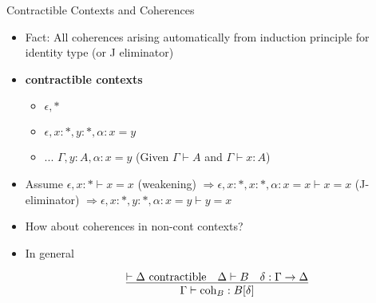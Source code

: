 \documentclass[12pt, mathserif,handout]{beamer}
\begin{document}
\begin{frame}[allowframebreaks,t,c]{Contractible Contexts and Coherences}

\begin{itemize}

\item Fact: All coherences arising automatically from induction principle for identity type (or J eliminator)

\item \textbf{contractible contexts}
\begin{itemize}
\item $\epsilon, * $
\item $\epsilon,x : *, y : *, \alpha : x = y$
\item ... $\Gamma, y: A , \alpha : x = y$ (Given $\Gamma \vdash A$ and
  $\Gamma \vdash x : A$)

\end{itemize}


\item Assume $\epsilon,x : * \vdash x = x$ (weakening)
$\Rightarrow \epsilon,x : *, x : *, \alpha : x = x \vdash x =
x$ (J-eliminator)
$\Rightarrow \epsilon,x : *, y : *, \alpha : x = y \vdash y = x$


\item How about coherences in non-cont contexts?

\item In general

\begin{equation*}
\infer{\Gamma \vdash \text{coh$_B$} : B [\delta]  }
{\vdash \Delta~ \text{contractible} & \Delta \vdash B & \delta : \Gamma \to \Delta} 
\end{equation*}

\end{itemize}

\end{frame}
\end{document}
